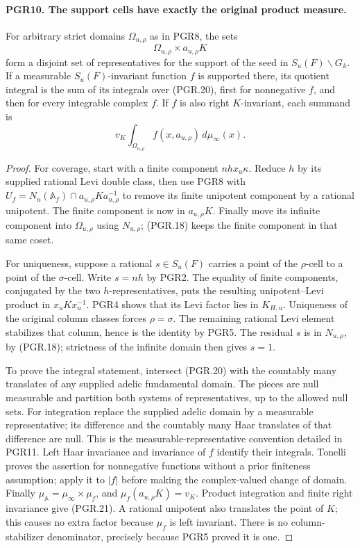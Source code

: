 \documentclass[11pt,a4paper]{article}
\numberwithin{equation}{section}
\theoremstyle{remark}\newtheorem{remark}[theorem]{Remark}
\begin{document}
\paragraph{PGR10. The support cells have exactly the original product measure.}
\label{claim:PGR10}
For arbitrary strict domains \(\Omega_{u,\rho}\) as in PGR8,
the sets
\[
              \Omega_{u,\rho}\times a_{u,\rho}K
\tag{PGR.20}
\]
form a disjoint set of representatives for the support of the seed in
\(S_u(F)\backslash G_{\mathbb A}\).  If a measurable
\(S_u(F)\)-invariant function \(f\) is supported there, its
quotient integral is the sum of its integrals over (PGR.20), first
for nonnegative \(f\), and then for every integrable complex \(f\).
If \(f\) is also right \(K\)-invariant, each summand is
\[
                  v_K\int_{\Omega_{u,\rho}}f(x,a_{u,\rho})\,d\mu_\infty(x).
\tag{PGR.21}
\]
\begin{proof}
For coverage, start with a finite component \(nhx_u\kappa\).
Reduce \(h\) by its supplied rational Levi double class, then
use PGR8 with
\(U_f=N_u(\mathbb A_f)\cap a_{u,\rho}Ka_{u,\rho}^{-1}\)
to remove its finite unipotent component by a rational unipotent.
The finite component is now in \(a_{u,\rho}K\).  Finally move
its infinite component into \(\Omega_{u,\rho}\) using
\(N_{u,\rho}\); (PGR.18) keeps the finite component in that
same coset.

For uniqueness, suppose a rational \(s\in S_u(F)\) carries
a point of the \(\rho\)-cell to a point of the \(\sigma\)-cell.
Write \(s=nh\) by PGR2.  The equality of finite components,
conjugated by the two \(h\)-representatives, puts the resulting
unipotent--Levi product in \(x_uKx_u^{-1}\).
PGR4 shows that its Levi factor lies in \(K_{H,u}\).
Uniqueness of the original column classes forces \(\rho=\sigma\).
The remaining rational Levi element stabilizes that column, hence
is the identity by PGR5.  The residual \(s\) is in
\(N_{u,\rho}\), by (PGR.18); strictness of the infinite domain
then gives \(s=1\).

To prove the integral statement, intersect (PGR.20) with the
countably many translates of any supplied adelic fundamental domain.
The pieces are null measurable and partition both systems of
representatives, up to the allowed null sets.  For integration replace
the supplied adelic domain by a measurable representative; its difference
and the countably many Haar translates of that difference are null.
This is the measurable-representative convention detailed in PGR11.
Left Haar invariance and invariance of
\(f\) identify their integrals.  Tonelli proves the assertion for
nonnegative functions without a prior finiteness assumption; apply
it to \(|f|\) before making the complex-valued change of domain.
Finally \(\mu_{\mathbb A}=\mu_\infty\times\mu_f\), and
\(\mu_f(a_{u,\rho}K)=v_K\).  Product integration and finite
right invariance give (PGR.21).  A rational unipotent also translates
the point of \(K\); this causes no extra factor because \(\mu_f\)
is left invariant.  There is no column-stabilizer denominator, precisely
because PGR5 proved it is one.
\end{proof}
\end{document}

